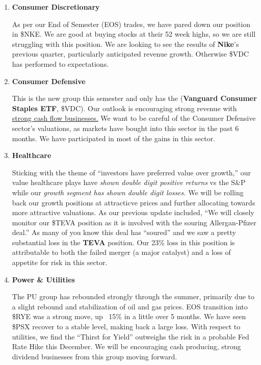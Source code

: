 \documentclass[11pt,pressrelease]{newlfm} %
\begin{document}
\begin{newlfm}


\vspace{-.25 in} 			%
\begin{singlespace} 		%

\begin{enumerate}
\item \textbf{Consumer Discretionary} \par
As per our End of Semester (EOS) trades, we have pared down our position in \$NKE. We are good at buying stocks at their 52 week highs, so we are still struggling with this position. We are looking to see the results of \textbf{Nike}'s previous quarter, particularly anticipated revenue growth. Otherwise \$VDC has performed to expectations.

\item \textbf{Consumer Defensive} \par
This is the new group this semester and only has the (\textbf{Vanguard Consumer Staples ETF}, \$VDC). Our outlook is encouraging strong revenue with \underline{strong cash flow businesses.} We want to be careful of the Consumer Defensive sector's valuations, as markets have bought into this sector in the past 6 months. We have participated in most of the gains in this sector. 

\item \textbf{Healthcare} \par
Sticking with the theme of ``investors have preferred value over growth,'' our value healthcare plays have \textit{shown double digit positive returns} vs the S\&P while our \textit{growth segment has shown double digit losses.}  We will be rolling back our growth positions at attracticve prices and further allocating towards more attractive valuations. As our previous update included, ``We will closely monitor our \$TEVA position as it is involved with the souring Allergan-Pfizer deal.'' As many of you know this deal has ``soured'' and we saw a pretty substantial loss in the \textbf{TEVA} position. Our 23\% loss in this position is attributable to both the failed merger (a major catalyst) and a loss of appetite for risk in this sector. 

\item \textbf{Power \& Utilities} \par
The PU group has rebounded strongly through the summer, primarily due to a slight rebound and stabilization of oil and gas prices. EOS transition into \$RYE was a strong move, up ~15\% in a little over 5 months. We have seen \$PSX recover to a stable level, making back a large loss.  With respect to utilities, we find the ``Thirst for Yield'' outweighs the risk in a probable Fed Rate Hike this December. We will be encouraging cash producing, strong dividend businesses from this group moving forward. 


\end{enumerate}
\end{singlespace}
\end{newlfm}
\end{document}
